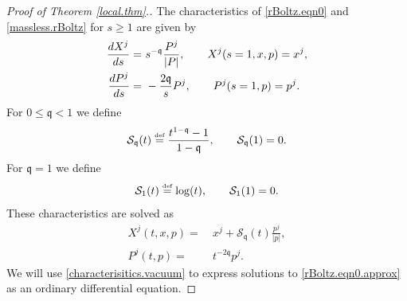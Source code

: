 \documentclass[reqno]{amsart}
\newcommand{\eqdef }{\overset{\mbox{\tiny{def}}}{=}}
\newcommand{\pv}{p}
\newcommand{\qq}{\mathfrak{q}}
\newcommand{\tiq}{\mathcal{S}_{\qq}}
\theoremstyle{definition}
\numberwithin{equation}{section}
\numberwithin{theorem}{section}
\begin{document}
\begin{proof}[Proof of Theorem \ref{local.thm}.]
The characteristics of \eqref{rBoltz.eqn0} and \eqref{massless.rBoltz} for $s \geq 1$ are given by 
\begin{equation}\notag
\begin{split}
\frac{d {X}^j}{ds}
= &~ 
s^{-\qq}\frac{{P}^j}{| {P}|}, \qquad {X}^j(s=1,x,\pv)=x^j,
\\
\frac{d {P}^j}{ds}
= &~ 
-\frac{2\qq }{s} P^j, \qquad {P}^j(s=1,\pv)=\pv^j.
\end{split}
\end{equation}
For $0 \leq \qq < 1$ we define
\begin{equation}\label{tiq.weight}
    \tiq(t) \eqdef \frac{t^{1-\qq}-1}{1-\qq}, \qquad \tiq(1)=0.
\end{equation}
For $\qq = 1$ we define 
\begin{equation}\label{weightflowq1}
    \mathcal{S}_1(t) \eqdef 
    \log(t), \qquad \mathcal{S}_1(1)=0.
\end{equation}
These characteristics are solved as
\begin{equation} \label{characterisitics.vacuum}
\begin{split}
{X}^j(t,x,\pv)
= &~ 
x^j+\tiq(t)\frac{\pv^j}{ |\pv|},
\\
{P}^j(t,\pv)
= &~ 
{t^{-2\qq }}p^j.
\end{split}
\end{equation}
We will use \eqref{characterisitics.vacuum} to express solutions to \eqref{rBoltz.eqn0.approx} as an ordinary differential equation.





\end{proof}
\end{document}

